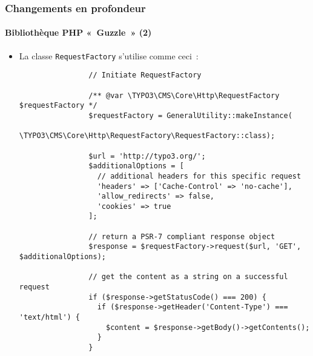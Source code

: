 \begin{frame}[fragile]
	\frametitle{Changements en profondeur}
	\framesubtitle{Bibliothèque PHP «~Guzzle~» (2)}

	\lstset{basicstyle=\tiny\ttfamily}

	\begin{itemize}

		\item La classe \texttt{RequestFactory} s'utilise comme ceci~:

			\begin{lstlisting}
				// Initiate RequestFactory

				/** @var \TYPO3\CMS\Core\Http\RequestFactory $requestFactory */
				$requestFactory = GeneralUtility::makeInstance(
				  \TYPO3\CMS\Core\Http\RequestFactory\RequestFactory::class);

				$url = 'http://typo3.org/';
				$additionalOptions = [
				  // additional headers for this specific request
				  'headers' => ['Cache-Control' => 'no-cache'],
				  'allow_redirects' => false,
				  'cookies' => true
				];

				// return a PSR-7 compliant response object
				$response = $requestFactory->request($url, 'GET', $additionalOptions);

				// get the content as a string on a successful request
				if ($response->getStatusCode() === 200) {
				  if ($response->getHeader('Content-Type') === 'text/html') {
				    $content = $response->getBody()->getContents();
				  }
				}
			\end{lstlisting}

	\end{itemize}

\end{frame}

